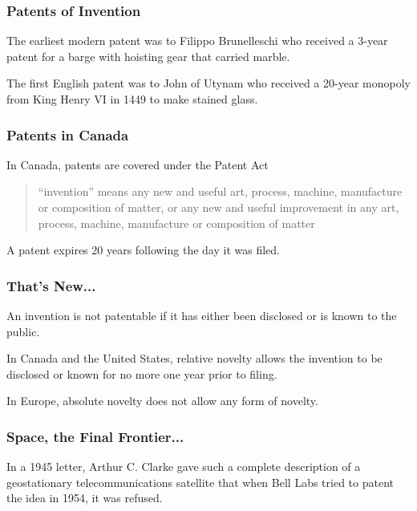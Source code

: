 \begin{frame}
\frametitle{Patents of Invention}

The earliest modern patent was to Filippo Brunelleschi who received a 3-year patent for a barge with hoisting gear that carried marble.


The first English patent was to John of Utynam  who received a 20-year monopoly from King Henry VI in 1449 to make stained glass.

\end{frame}



\begin{frame}
\frametitle{Patents in Canada}

In Canada, patents are covered under the Patent Act

\begin{quote}
``invention'' means any new and useful art, process, machine, manufacture or composition of matter, or any new and useful improvement in any art, process, machine, manufacture or composition of matter
\end{quote}

A patent expires 20 years following the day it was filed.

\end{frame}



\begin{frame}
\frametitle{That's New...}

An invention is not patentable if it has either been disclosed or is known to the public.

In Canada and the United States, \alert{relative novelty} allows the invention to be disclosed or known for no more one year prior to filing.

In Europe, \alert{absolute novelty} does not allow any form of novelty.

\end{frame}



\begin{frame}
\frametitle{Space, the Final Frontier...}

In a 1945 letter, Arthur C. Clarke  gave such a complete  description of a  geostationary telecommunications  satellite that when Bell Labs
tried to patent the idea in 1954, it was refused.

\end{frame}




